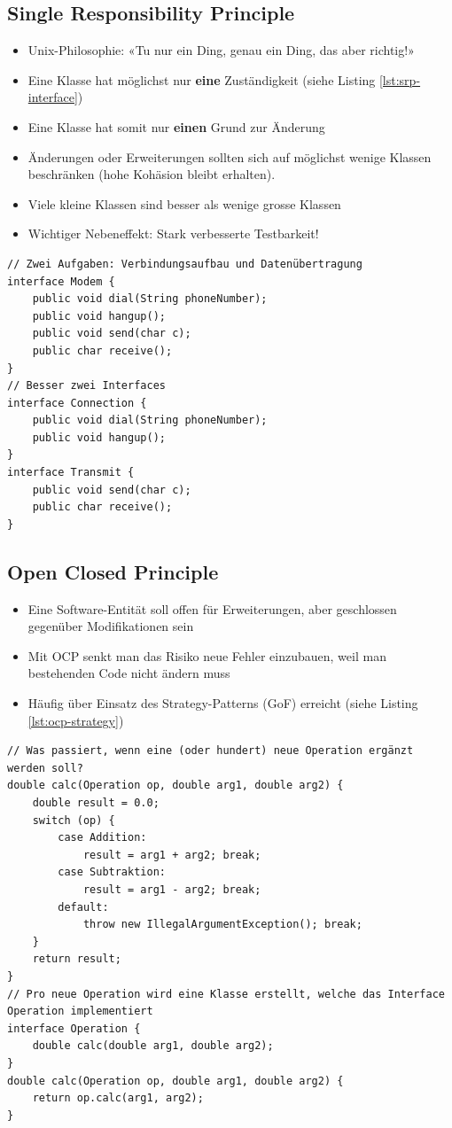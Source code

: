 \subsection{Single Responsibility Principle}

\begin{itemize}
	\item Unix-Philosophie: «Tu nur ein Ding, genau ein Ding, das aber richtig!»
	\item Eine Klasse hat möglichst nur \textbf{eine} Zuständigkeit (siehe Listing \ref{lst:srp-interface})
	\item Eine Klasse hat somit nur \textbf{einen} Grund zur Änderung
	\item Änderungen oder Erweiterungen sollten sich auf möglichst wenige Klassen beschränken (hohe Kohäsion bleibt erhalten).
	\item Viele kleine Klassen sind besser als wenige grosse Klassen
	\item Wichtiger Nebeneffekt: Stark verbesserte Testbarkeit!
\end{itemize}

\begin{lstlisting}[caption={Schlechtes Interface nach SRP},label=lst:srp-interface]
// Zwei Aufgaben: Verbindungsaufbau und Datenübertragung
interface Modem {
	public void dial(String phoneNumber);
	public void hangup();
	public void send(char c);
	public char receive();
}
// Besser zwei Interfaces
interface Connection {
	public void dial(String phoneNumber);
	public void hangup();
}
interface Transmit {
	public void send(char c);
	public char receive();
}
\end{lstlisting}

\subsection{Open Closed Principle}

\begin{itemize}
	\item Eine Software-Entität soll offen für Erweiterungen, aber geschlossen gegenüber Modifikationen sein
	\item Mit OCP senkt man das Risiko neue Fehler einzubauen, weil man bestehenden Code nicht ändern muss
	\item Häufig über Einsatz des Strategy-Patterns (GoF) erreicht (siehe Listing \ref{lst:ocp-strategy})
\end{itemize}

\begin{lstlisting}[caption={Strategy Pattern um OCP umzusetzen},label=lst:ocp-strategy]
// Was passiert, wenn eine (oder hundert) neue Operation ergänzt werden soll?
double calc(Operation op, double arg1, double arg2) {
	double result = 0.0;
	switch (op) {
		case Addition:
			result = arg1 + arg2; break;
		case Subtraktion:
			result = arg1 - arg2; break;
		default:
			throw new IllegalArgumentException(); break;
	}
	return result;
}
// Pro neue Operation wird eine Klasse erstellt, welche das Interface Operation implementiert
interface Operation {
	double calc(double arg1, double arg2);
}
double calc(Operation op, double arg1, double arg2) {
	return op.calc(arg1, arg2);
}
\end{lstlisting}

